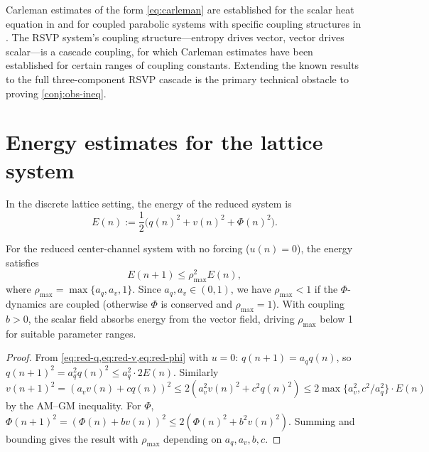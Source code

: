 \documentclass[12pt, oneside]{memoir}
\newcommand{\aq}{a_q}
\newcommand{\av}{a_v}
\begin{document}
\begin{remark}
Carleman estimates of the form \cref{eq:carleman} are established for the scalar heat
equation in \cite{fabre1995} and for coupled parabolic systems with specific coupling
structures in \cite{gonzalez2006}.  The RSVP system's coupling structure---entropy drives
vector, vector drives scalar---is a cascade coupling, for which Carleman estimates have
been established for certain ranges of coupling constants.  Extending the known results
to the full three-component RSVP cascade is the primary technical obstacle to proving
\cref{conj:obs-ineq}.
\end{remark}

\section{Energy estimates for the lattice system}

In the discrete lattice setting, the energy of the reduced system is
\begin{equation}
  E(n) := \frac{1}{2}\bigl(q(n)^2 + v(n)^2 + \Phi(n)^2\bigr).
\end{equation}

\begin{proposition}
\label{prop:energy-diss}
For the reduced center-channel system  with no forcing
($u(n) = 0$), the energy satisfies
\begin{equation}
  E(n+1) \le \rho_{\max}^2 E(n),
\end{equation}
where $\rho_{\max} = \max\{\aq, \av, 1\}$.  Since $\aq, \av \in (0,1)$, we have
$\rho_{\max} < 1$ if the $\Phi$-dynamics are coupled (otherwise $\Phi$ is conserved and
$\rho_{\max} = 1$).  With coupling $b > 0$, the scalar field absorbs energy from the
vector field, driving $\rho_{\max}$ below 1 for suitable parameter ranges.
\end{proposition}

\begin{proof}
From \cref{eq:red-q,eq:red-v,eq:red-phi} with $u = 0$: $q(n+1) = \aq q(n)$, so
$q(n+1)^2 = \aq^2 q(n)^2 \le \aq^2 \cdot 2E(n)$.  Similarly $v(n+1)^2 = (\av v(n) +
cq(n))^2 \le 2(\av^2 v(n)^2 + c^2 q(n)^2) \le 2\max\{\av^2, c^2/\aq^2\} \cdot E(n)$
by the AM--GM inequality.  For $\Phi$, $\Phi(n+1)^2 = (\Phi(n) + bv(n))^2 \le
2(\Phi(n)^2 + b^2 v(n)^2)$.  Summing and bounding gives the result with $\rho_{\max}$
depending on $\aq, \av, b, c$.
\end{proof}
\end{document}
